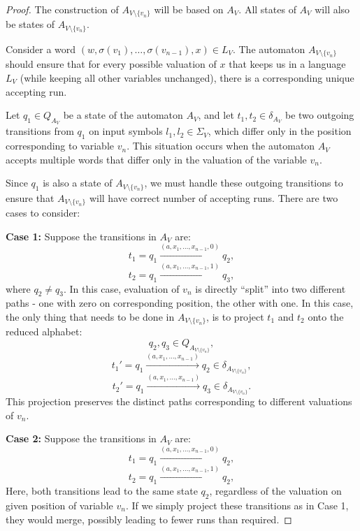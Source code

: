 \documentclass[12pt]{article}
\theoremstyle{definition}
\begin{document}
\begin{proof}
    The construction of $A_{V \setminus \{v_n\}}$ will be based on $A_V$. All states of $A_V$ will also be states of $A_{V \setminus \{v_n\}}$.
    
    Consider a word $(w, \sigma(v_1), \ldots, \sigma(v_{n-1}), x) \in L_V$. The automaton $A_{V \setminus \{v_n\}}$ should ensure that for every possible valuation of $x$ that keeps us in a language $L_V$ (while keeping all other variables unchanged), there is a corresponding unique accepting run.

    Let $q_1 \in Q_{A_V}$ be a state of the automaton $A_V$, and let $t_1, t_2 \in \delta_{A_V}$ be two outgoing transitions from $q_1$ on input symbols $l_1, l_2 \in \Sigma_V$, which differ only in the position corresponding to variable $v_n$. This situation occurs when the automaton $A_V$ accepts multiple words that differ only in the valuation of the variable $v_n$.

    Since $q_1$ is also a state of $A_{V \setminus \{v_n\}}$, we must handle these outgoing transitions to ensure that $A_{V \setminus \{v_n\}}$ will have correct number of accepting runs. There are two cases to consider:

    \textbf{Case 1:}
    Suppose the transitions in $A_V$ are:
    $$t_1 = q_1 \xrightarrow{(a, x_1, \ldots, x_{n-1}, 0)} q_2,$$
    $$t_2 = q_1 \xrightarrow{(a, x_1, \ldots, x_{n-1}, 1)} q_3,$$
    where $q_2 \neq q_3$. In this case, evaluation of $v_n$ is directly ``split'' into two different paths - one with zero on corresponding position, the other with one. In this case, the only thing that needs to be done in $A_{V \setminus \{v_n\}}$, is to project $t_1$ and $t_2$ onto the reduced alphabet:
    $$q_2, q_3 \in Q_{A_{V \setminus \{v_n\}}},$$
    $$t_1' = q_1 \xrightarrow{(a, x_1, \ldots, x_{n-1})} q_2 \in \delta_{A_{V \setminus \{v_n\}}},$$
    $$t_2' = q_1 \xrightarrow{(a, x_1, \ldots, x_{n-1})} q_3 \in \delta_{A_{V \setminus \{v_n\}}}.$$
    This projection preserves the distinct paths corresponding to different valuations of $v_n$.

    \textbf{Case 2:}
    Suppose the transitions in $A_V$ are:
    $$t_1 = q_1 \xrightarrow{(a, x_1, \ldots, x_{n-1}, 0)} q_2,$$
    $$t_2 = q_1 \xrightarrow{(a, x_1, \ldots, x_{n-1}, 1)} q_2,$$
    Here, both transitions lead to the same state $q_2$, regardless of the valuation on given position of variable $v_n$. If we simply project these transitions as in Case 1, they would merge, possibly leading to fewer runs than required.


\end{proof}
\end{document}
